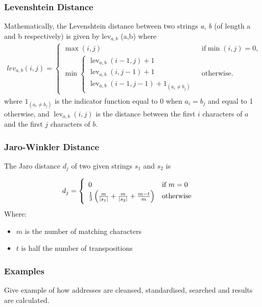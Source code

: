 \subsubsection{Levenshtein Distance}
Mathematically, the Levenshtein distance between two strings \textit{a}, \textit{b} (of length \text{\textbar}a\text{\textbar} and \text{\textbar}b\text{\textbar} respectively) is given by lev$_{a,b}$ (\text{\textbar}a\text{\textbar},\text{\textbar}b\text{\textbar}) where
\begin{align}
lev_{a,b}(i,j) = 
\begin{cases}
\max(i,j) & \text{ if} \min(i,j)=0, \\
\min \begin{cases}
\operatorname{lev}_{a,b}(i-1,j) + 1 \\
\operatorname{lev}_{a,b}(i,j-1) + 1 \\
\operatorname{lev}_{a,b}(i-1,j-1) + 1_{(a_i \neq b_j)}
\end{cases} & \text{ otherwise.}
\end{cases}
\end{align}
where $1_{(a_i \neq b_j)}$ is the indicator function equal to $0$ when $a_i = b_j$ and equal to 1 otherwise, and $\operatorname{lev}_{a,b}(i,j)$ is the distance between the first $i$ characters of $a$ and the first $j$ characters of $b$.


\subsubsection{Jaro-Winkler Distance}
The Jaro distance $d_j$ of two given strings $s_1$ and $s_2$ is

\begin{align}
d_j =\begin{cases}
\begin{array}{l l}
0 & \text{if }m = 0\\
\frac{1}{3}\left(\frac{m}{|s_1|} + \frac{m}{|s_2|} + \frac{m-t}{m}\right) & \text{otherwise} \end{array} \end{cases}
\end{align}
Where: 
\vspace{-7mm} 
\begin{itemize}
	\item $m$ is the number of matching characters 
	\item $t$ is half the number of transpositions
\end{itemize}

\subsubsection{Examples}
Give example of how addresses are cleansed, standardised, searched and results are calculated.

